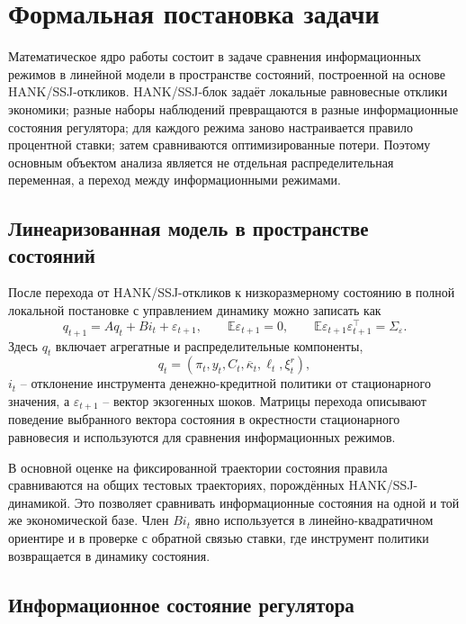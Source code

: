 \section{Формальная постановка задачи}

Математическое ядро работы состоит в задаче сравнения информационных режимов в линейной модели
в пространстве состояний, построенной на основе HANK/SSJ-откликов. HANK/SSJ-блок задаёт локальные
равновесные отклики экономики; разные наборы наблюдений превращаются в разные информационные
состояния регулятора; для каждого режима заново настраивается правило процентной ставки; затем
сравниваются оптимизированные потери. Поэтому основным объектом анализа является не отдельная
распределительная переменная, а переход между информационными режимами.

\subsection{Линеаризованная модель в пространстве состояний}

После перехода от HANK/SSJ-откликов к низкоразмерному состоянию в полной локальной постановке с
управлением динамику можно записать как
\[
q_{t+1}
=
Aq_t+B i_t+\varepsilon_{t+1},
\qquad
\mathbb E\varepsilon_{t+1}=0,
\qquad
\mathbb E\varepsilon_{t+1}\varepsilon_{t+1}^{\top}=\Sigma_\varepsilon .
\]
Здесь \(q_t\) включает агрегатные и распределительные компоненты,
\[
q_t=(\pi_t,y_t,C_t,\overline{\kappa}_t,\ell_t,\xi_t^r),
\]
\(i_t\) -- отклонение инструмента денежно-кредитной политики от стационарного значения, а
\(\varepsilon_{t+1}\) -- вектор экзогенных шоков. Матрицы перехода описывают поведение выбранного
вектора состояния в окрестности стационарного равновесия и используются для сравнения
информационных режимов.

В основной оценке на фиксированной траектории состояния правила сравниваются на общих тестовых
траекториях, порождённых HANK/SSJ-динамикой. Это позволяет сравнивать информационные состояния на одной и той же
экономической базе. Член \(B i_t\) явно используется в линейно-квадратичном ориентире и в проверке
с обратной связью ставки, где инструмент политики возвращается в динамику состояния.

\subsection{Информационное состояние регулятора}

